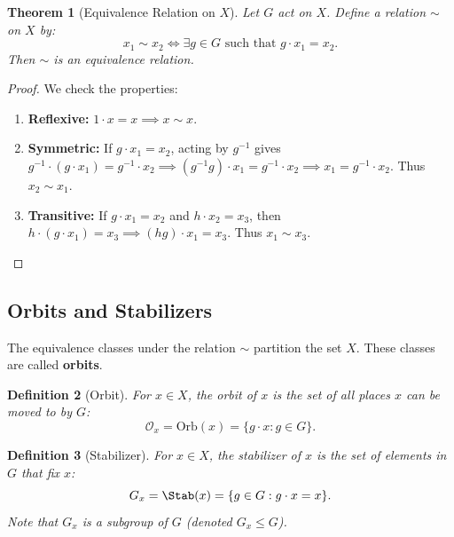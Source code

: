 \documentclass[a4paper,12pt]{article}
\newtheorem{thm}{Theorem}[section]
\newtheorem{defn}[thm]{Definition}
\begin{document}
\begin{thm}[Equivalence Relation on $X$]
    Let $G$ act on $X$. Define a relation $\sim$ on $X$ by:
    \[ x_1 \sim x_2 \iff \exists g \in G \text{ such that } g \cdot x_1 = x_2. \]
    Then $\sim$ is an equivalence relation.
\end{thm}
\begin{proof}
    We check the properties:
    \begin{enumerate}
        \item \textbf{Reflexive:} $1 \cdot x = x \implies x \sim x$.
        \item \textbf{Symmetric:} If $g \cdot x_1 = x_2$, acting by $g^{-1}$ gives $g^{-1} \cdot (g \cdot x_1) = g^{-1} \cdot x_2 \implies (g^{-1}g) \cdot x_1 = g^{-1} \cdot x_2 \implies x_1 = g^{-1} \cdot x_2$. Thus $x_2 \sim x_1$.
        \item \textbf{Transitive:} If $g \cdot x_1 = x_2$ and $h \cdot x_2 = x_3$, then $h \cdot (g \cdot x_1) = x_3 \implies (hg) \cdot x_1 = x_3$. Thus $x_1 \sim x_3$.
    \end{enumerate}
\end{proof}

\subsection{Orbits and Stabilizers}

The equivalence classes under the relation $\sim$ partition the set $X$. These classes are called \textbf{orbits}.

\begin{defn}[Orbit]
    For $x \in X$, the orbit of $x$ is the set of all places $x$ can be moved to by $G$:
    \[ \mathcal{O}_x = \text{Orb}(x) = \{g \cdot x : g \in G\}. \]
\end{defn}

\begin{defn}[Stabilizer]
    For $x \in X$, the stabilizer of $x$ is the set of elements in $G$ that fix $x$:
    \[ G_x = \Stab(x) = \{g \in G : g \cdot x = x\}. \]
    Note that $G_x$ is a subgroup of $G$ (denoted $G_x \leq G$).
\end{defn}
\end{document}
